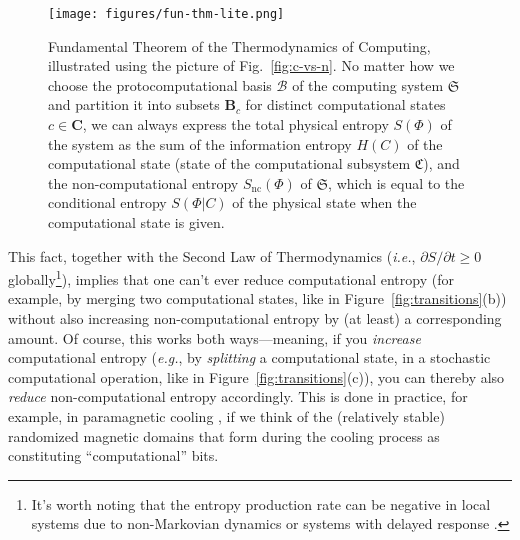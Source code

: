 \documentclass[preprints,article,accept,moreauthors,pdftex]{Definitions/mdpi}
\begin{document}
\begin{paracol}{2}
\begin{figure}[h] %
\centerline{\texttt{[image: figures/fun-thm-lite.png]}}
\caption{Fundamental Theorem of the Thermodynamics of Computing, illustrated using the picture of Fig.~\ref{fig:c-vs-n}. No matter how we choose the protocomputational basis $\boldsymbol{\mathcal{B}}$ of the computing system $\mathfrak{S}$ and partition it into subsets $\boldsymbol{B}_c$ for distinct computational states $c\in\boldsymbol{C}$, we can always express the total physical entropy $S(\Phi)$ of the system as the sum of the information entropy $H(C)$ of the computational state (state of the computational subsystem $\mathfrak{C}$), and the non-computational entropy $S_\mathrm{nc}(\Phi)$ of $\mathfrak{S}$, which is equal to the conditional entropy $S(\Phi|C)$ of the physical state when the computational state is given.\label{fig:fun-thm}}
\end{figure}   

This fact, together with the Second Law of Thermodynamics (\emph{i.e.}, $\partial S/\partial t \geq 0$ globally\footnote{It's worth noting that the entropy production rate can be negative in local systems due to non-Markovian dynamics \cite{SE19} or systems with delayed response \cite{BND21}.}), implies that one can't ever reduce computational entropy (for example, by merging two computational states, like in Figure~\ref{fig:transitions}(b)) without also increasing non-computational entropy by (at least) a corresponding amount. Of course, this works both ways---meaning, if you \emph{increase} computational entropy (\emph{e.g.}, by \emph{splitting} a computational state, in a stochastic computational operation, like in Figure~\ref{fig:transitions}(c)), you can thereby also \emph{reduce} non-computational entropy accordingly. This is done in practice, for example, in paramagnetic cooling \cite{DWK34,KWG60,PG99}, if we think of the (relatively stable) randomized magnetic domains that form during the cooling process as constituting ``computational'' bits.


\end{paracol}
\end{document}
